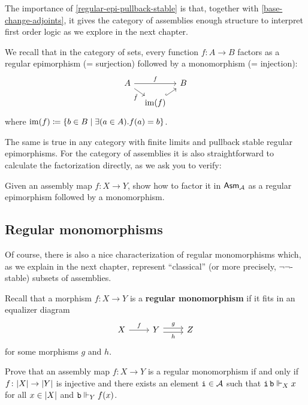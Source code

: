 The importance of \cref{regular-epi-pullback-stable} is that, together with
\cref{base-change-adjoints}, it gives the category of assemblies enough
structure to interpret first order logic as we explore in the next chapter.

We recall that in the category of sets, every function \(f \colon A \to B\)
factors as a regular epimorphism (= surjection) followed by a monomorphism (=
injection):
\[
  \begin{tikzcd}[row sep=3mm,column sep=3mm]
    A \ar[dr,"\tilde f"'] \ar[rr,"f"] & & B \\
    & \im(f) \ar[ur,hookrightarrow]
  \end{tikzcd}
\]
where \(\operatorname{im}(f) \coloneq \{b \in B \mid \exists (a \in A).f(a) = b\}\).
%

The same is true in any category with finite limits and pullback stable regular
epimorphisms.
%
For the category of assemblies it is also straightforward to calculate the
factorization directly, as we ask you to verify:

\begin{exercise}\label{exer:reg-epi-mono-factorization}
  Given an assembly map \(f \colon X \to Y\), show how to factor it in
  \(\mathsf{Asm}_{\mathcal A}\) as a regular epimorphism followed by a monomorphism.
\end{exercise}

\subsection{Regular monomorphisms}\label{sec:regular-monos}
Of course, there is also a nice characterization of regular monomorphisms which,
as we explain in the next chapter, represent ``classical'' (or more precisely,
\(\lnot\lnot\)-stable) subsets of assemblies.

Recall that a morphism \(f \colon X \to Y\) is a \textbf{regular monomorphism}
if it fits in an equalizer diagram
\[
  \begin{tikzcd}
    X \ar[r,"f"]
    & Y \ar[r,shift left, "g"]\ar[r, shift right, "h"']
    & Z
  \end{tikzcd}
\]
for some morphisms \(g\) and \(h\).

\begin{exercise}%
  \label{exer:characterize-regular-monos}
  Prove that an assembly map \(f \colon X \to Y\) is a regular monomorphism if
  and only if \(f \colon \lvert X\rvert \to \lvert Y\rvert\) is injective and there
  exists an element \(\operatorname{\mathtt{i}} \in \mathcal A\) such that
  \(\operatorname{\mathtt{i}}\operatorname{\mathtt{b}} \Vdash_X x\) for all \(x \in \lvert X\rvert\) and
  \(\operatorname{\mathtt{b}} \Vdash_Y f(x)\).
\end{exercise}

